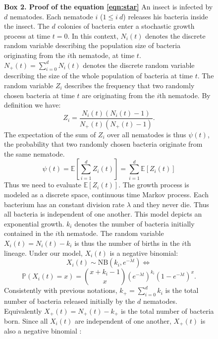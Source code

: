 \documentclass[10pt]{article}
\newcommand{\pr}{{\mathbb{P}}}
\begin{document}
\begin{multicols}{2}
\begin{figure}[hbt!]
\end{figure}
\begin{figure}[hbtp!]
\begin{mdframed}
\begin{multicols}{2}
\textbf{Box 2. Proof of the equation \eqref{eqn:star}}
\label{box:psi_simultaneous}
An insect is infected by $d$ nematodes.
Each nematode $i$ ($ 1 \leq i \ d$) releases his bacteria inside the insect.
The $d$ colonies of bacteria enter a stochastic growth process at time $t=0$.
In this context, $N_i(t)$ denotes the discrete random variable describing the population size of bacteria originating from the $i$th nematode, at time $t$.
$N_+(t)=\sum_{i=0}^d N_i(t)$ denotes the discrete random variable describing the size of the whole population of bacteria at time $t$.
The random variable $Z_i$ describes the frequency that two randomly chosen bacteria at time $t$ are originating from the $i$th nematode.
By definition we have:
\begin{equation}
Z_i=\dfrac{N_i(t)(N_i(t)-1)}{N_+(t)( N_+(t)-1 ) }.
\end{equation}
The expectation of the sum of $Z_i$ over all nematodes is thus $\psi (t)$, the probability
that two randomly chosen bacteria originate from the same nematode.
\begin{equation}
\psi(t) = \mathbb{E} \left[ \sum_{i=1}^d Z_i(t) \right] = \sum_{i=1}^d \mathbb{E}[ Z_i(t)]
\end{equation}
Thus we need to evaluate $\mathbb{E}[ Z_i(t)]$.
The growth process is modeled as a discrete space, continuous time Markov process. Each bacterium has an constant division rate $\lambda$ and they never die. Thus all bacteria is independent of one another. This model depicts an exponential growth.
$k_i$ denotes the number of bacteria initially contained in the $i$th nematode. The random variable $X_i(t)=N_i(t)-k_i$ is thus the number of births in the $i$th lineage. Under our model,
$X_i(t)$ is a negative binomial\cite[p. 158]{cox1977theory}:
\begin{equation}
X_i(t) \sim \mathrm{NB} \left( k_i, e^{-\lambda t} \right) \iff
\end{equation}
\begin{equation}
\pr(X_i(t)=x)=\binom{x+k_i -1}{x} \left( e^{-\lambda t} \right)^{k_i} \left( 1-e^{-\lambda t} \right)^{x}.
\end{equation}
Consistently with previous notations, $k_+=\sum_{i=0}^d k_i$ is the total number of bacteria released initially by the $d$ nematodes.
Equivalently $X_+(t)=N_+(t)-k_+$ is the total number of bacteria born. Since all $X_i(t)$ are independent of one another, $X_+(t)$ is also a negative binomial \cite{johnson2005univariate}:

\end{multicols}
\end{mdframed}
\end{figure}
\end{multicols}
\end{document}
